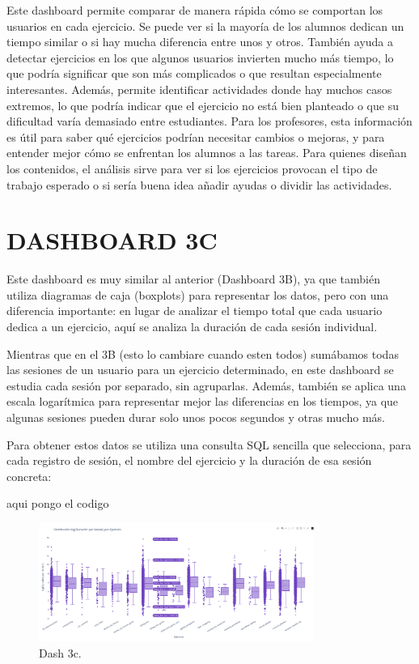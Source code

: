 \documentclass[a4paper, 12pt]{book}
\begin{document}
Este dashboard permite comparar de manera rápida cómo se comportan los usuarios en cada ejercicio. Se puede ver si la mayoría de los alumnos dedican un tiempo similar o si hay mucha diferencia entre unos y otros. También ayuda a detectar ejercicios en los que algunos usuarios invierten mucho más tiempo, lo que podría significar que son más complicados o que resultan especialmente interesantes. Además, permite identificar actividades donde hay muchos casos extremos, lo que podría indicar que el ejercicio no está bien planteado o que su dificultad varía demasiado entre estudiantes. Para los profesores, esta información es útil para saber qué ejercicios podrían necesitar cambios o mejoras, y para entender mejor cómo se enfrentan los alumnos a las tareas. Para quienes diseñan los contenidos, el análisis sirve para ver si los ejercicios provocan el tipo de trabajo esperado o si sería buena idea añadir ayudas o dividir las actividades.

\section{DASHBOARD 3C}

Este dashboard es muy similar al anterior (Dashboard 3B), ya que también utiliza diagramas de caja (boxplots) para representar los datos, pero con una diferencia importante: en lugar de analizar el tiempo total que cada usuario dedica a un ejercicio, aquí se analiza la duración de cada sesión individual.

Mientras que en el 3B (esto lo cambiare cuando esten todos) sumábamos todas las sesiones de un usuario para un ejercicio determinado, en este dashboard se estudia cada sesión por separado, sin agruparlas. Además, también se aplica una escala logarítmica para representar mejor las diferencias en los tiempos, ya que algunas sesiones pueden durar solo unos pocos segundos y otras mucho más.

Para obtener estos datos se utiliza una consulta SQL sencilla que selecciona, para cada registro de sesión, el nombre del ejercicio y la duración de esa sesión concreta:

aqui pongo el codigo

\begin{figure}
  \centering
  \includegraphics[width=9cm, keepaspectratio]{img/3c.png}
  \caption{Dash 3c.}\label{fig:3c}
\end{figure}
\end{document}
